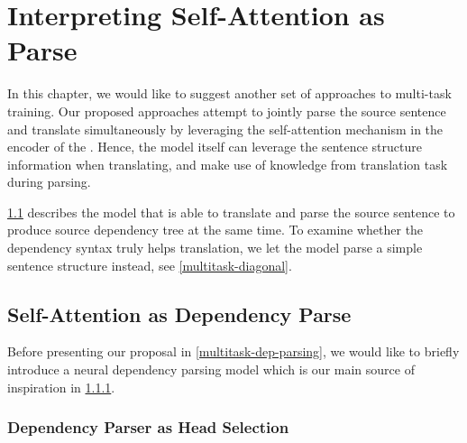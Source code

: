 

\chapter{Interpreting Self-Attention as Parse}
\label{multitask}

In this chapter, we would like to suggest another set of approaches to multi-task training.
Our proposed approaches attempt to jointly parse the source sentence and translate simultaneously by leveraging the self-attention mechanism in the encoder of the \transformer.
Hence, the model itself can leverage the sentence structure information when translating, and make use of knowledge from translation task during parsing.

\cref{multitask-dep} describes the model that is able to translate and parse the source sentence to produce source dependency tree at the same time.
To examine whether the dependency syntax truly helps translation, we let the model parse a simple sentence structure instead, see \cref{multitask-diagonal}.

\section{Self-Attention as Dependency Parse}
\label{multitask-dep}

Before presenting our proposal in \cref{multitask-dep-parsing}, we would like to briefly introduce a neural dependency parsing model which is our main source of inspiration in \cref{multitask-dep-dozat}.

\subsection{Dependency Parser as Head Selection}
\label{multitask-dep-dozat}

